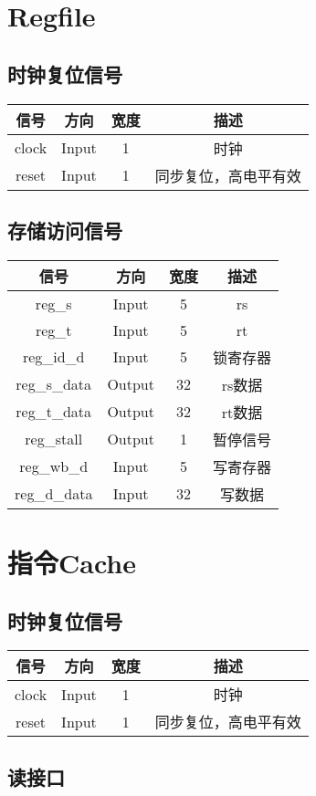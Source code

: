\documentclass{article}
\newenvironment{signals}{
	\begin{center}
		\begin{tabular}{| c | c | c | c |}
			\hline
			信号 & 方向 & 宽度 & 描述 \\ \hline
}{
		\end{tabular}
	\end{center}
}
\newcommand\sigin{Input}
\newcommand\sigout{Output}
\begin{document}
\section{Regfile}

\subsection{时钟复位信号}

\begin{signals}
	clock & \sigin & 1 & 时钟 \\ \hline
	reset & \sigin & 1 & 同步复位，高电平有效 \\ \hline
\end{signals}

\subsection{存储访问信号}

\begin{signals}
	reg\_s & \sigin & 5 & rs \\ \hline
	reg\_t & \sigin & 5 & rt \\ \hline
	reg\_id\_d & \sigin & 5 & 锁寄存器 \\ \hline
	reg\_s\_data & \sigout & 32 & rs数据 \\ \hline
	reg\_t\_data & \sigout & 32 & rt数据 \\ \hline
	reg\_stall & \sigout & 1 & 暂停信号 \\ \hline
	reg\_wb\_d & \sigin & 5 & 写寄存器 \\ \hline
	reg\_d\_data & \sigin & 32 & 写数据 \\ \hline
\end{signals}

\section{指令Cache}

\subsection{时钟复位信号}

\begin{signals}
	clock & \sigin & 1 & 时钟 \\ \hline
	reset & \sigin & 1 & 同步复位，高电平有效 \\ \hline
\end{signals}

\subsection{读接口}
\end{document}
